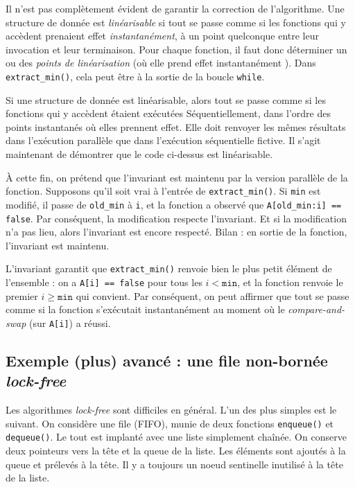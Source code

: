 Il n'est pas complètement évident de garantir la correction de l'algorithme. Une
structure de donnée est \emph{linéarisable} si tout se passe comme si les
fonctions qui y accèdent prenaient effet \emph{instantanément}, à un point
quelconque entre leur invocation et leur terminaison. Pour chaque fonction, il
faut donc déterminer un ou des \emph{points de linéarisation} (où elle prend
effet \og instantanément \fg{}). Dans \texttt{extract\_min()}, cela peut être à
la sortie de la boucle \texttt{while}.

Si une structure de donnée est linéarisable, alors tout se passe comme si les
fonctions qui y accèdent étaient exécutées Séquentiellement, dans l'ordre des
points \og instantanés\fg{} où elles prennent effet. Elle doit renvoyer les
mêmes résultats dans l'exécution parallèle que dans l'exécution séquentielle
fictive. Il s'agit maintenant de démontrer que le code ci-dessus est
linéarisable.

À cette fin, on prétend que l'invariant est maintenu par la version parallèle de
la fonction. Supposons qu'il soit vrai à l'entrée de \texttt{extract\_min()}. Si
\texttt{min} est modifié, il passe de \texttt{old\_min} à \texttt{i}, et la
fonction a observé que \texttt{A[old\_min:i] == false}. Par conséquent, la
modification respecte l'invariant. Et si la modification n'a pas lieu, alors
l'invariant est encore respecté. Bilan : en sortie de la fonction, l'invariant
est maintenu.

L'invariant garantit que \texttt{extract\_min()} renvoie bien le plus petit
élément de l'ensemble : on a \texttt{A[i] == false} pour tous les
$i < \texttt{min}$, et la fonction renvoie le premier $i \geq \texttt{min}$ qui
convient. Par conséquent, on peut affirmer que \og tout se passe comme si la
fonction s'exécutait instantanément au moment où le \emph{compare-and-swap} (sur
\texttt{A[i]}) a réussi\fg{}.

\subsection{Exemple (plus) avancé : une file non-bornée \emph{lock-free}}

Les algorithmes \emph{lock-free} sont difficiles en général. L'un des plus
simples est le suivant. On considère une file (FIFO), munie de deux fonctions
\texttt{enqueue()} et \texttt{dequeue()}. Le tout est implanté avec une liste
simplement chaînée. On conserve deux pointeurs vers la tête et la queue de la
liste. Les éléments sont ajoutés à la queue et prélevés à la tête. Il y a
toujours un noeud \og sentinelle\fg{} inutilisé à la tête de la liste.

